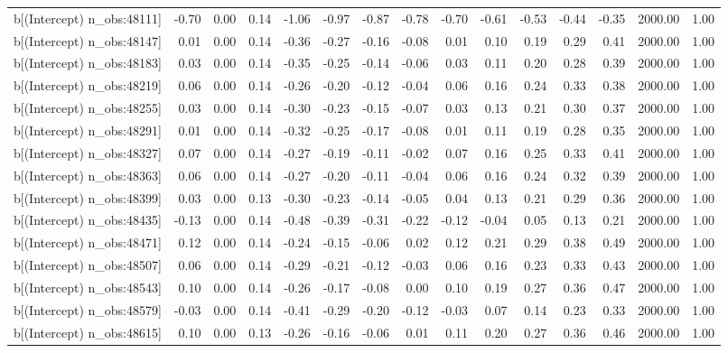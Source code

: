 \begin{table}[ht]
\begin{tabular}{rrrrrrrrrrrrrrr}
  b[(Intercept) n\_obs:48111] & -0.70 & 0.00 & 0.14 & -1.06 & -0.97 & -0.87 & -0.78 & -0.70 & -0.61 & -0.53 & -0.44 & -0.35 & 2000.00 & 1.00 \\ 
  b[(Intercept) n\_obs:48147] & 0.01 & 0.00 & 0.14 & -0.36 & -0.27 & -0.16 & -0.08 & 0.01 & 0.10 & 0.19 & 0.29 & 0.41 & 2000.00 & 1.00 \\ 
  b[(Intercept) n\_obs:48183] & 0.03 & 0.00 & 0.14 & -0.35 & -0.25 & -0.14 & -0.06 & 0.03 & 0.11 & 0.20 & 0.28 & 0.39 & 2000.00 & 1.00 \\ 
  b[(Intercept) n\_obs:48219] & 0.06 & 0.00 & 0.14 & -0.26 & -0.20 & -0.12 & -0.04 & 0.06 & 0.16 & 0.24 & 0.33 & 0.38 & 2000.00 & 1.00 \\ 
  b[(Intercept) n\_obs:48255] & 0.03 & 0.00 & 0.14 & -0.30 & -0.23 & -0.15 & -0.07 & 0.03 & 0.13 & 0.21 & 0.30 & 0.37 & 2000.00 & 1.00 \\ 
  b[(Intercept) n\_obs:48291] & 0.01 & 0.00 & 0.14 & -0.32 & -0.25 & -0.17 & -0.08 & 0.01 & 0.11 & 0.19 & 0.28 & 0.35 & 2000.00 & 1.00 \\ 
  b[(Intercept) n\_obs:48327] & 0.07 & 0.00 & 0.14 & -0.27 & -0.19 & -0.11 & -0.02 & 0.07 & 0.16 & 0.25 & 0.33 & 0.41 & 2000.00 & 1.00 \\ 
  b[(Intercept) n\_obs:48363] & 0.06 & 0.00 & 0.14 & -0.27 & -0.20 & -0.11 & -0.04 & 0.06 & 0.16 & 0.24 & 0.32 & 0.39 & 2000.00 & 1.00 \\ 
  b[(Intercept) n\_obs:48399] & 0.03 & 0.00 & 0.13 & -0.30 & -0.23 & -0.14 & -0.05 & 0.04 & 0.13 & 0.21 & 0.29 & 0.36 & 2000.00 & 1.00 \\ 
  b[(Intercept) n\_obs:48435] & -0.13 & 0.00 & 0.14 & -0.48 & -0.39 & -0.31 & -0.22 & -0.12 & -0.04 & 0.05 & 0.13 & 0.21 & 2000.00 & 1.00 \\ 
  b[(Intercept) n\_obs:48471] & 0.12 & 0.00 & 0.14 & -0.24 & -0.15 & -0.06 & 0.02 & 0.12 & 0.21 & 0.29 & 0.38 & 0.49 & 2000.00 & 1.00 \\ 
  b[(Intercept) n\_obs:48507] & 0.06 & 0.00 & 0.14 & -0.29 & -0.21 & -0.12 & -0.03 & 0.06 & 0.16 & 0.23 & 0.33 & 0.43 & 2000.00 & 1.00 \\ 
  b[(Intercept) n\_obs:48543] & 0.10 & 0.00 & 0.14 & -0.26 & -0.17 & -0.08 & 0.00 & 0.10 & 0.19 & 0.27 & 0.36 & 0.47 & 2000.00 & 1.00 \\ 
  b[(Intercept) n\_obs:48579] & -0.03 & 0.00 & 0.14 & -0.41 & -0.29 & -0.20 & -0.12 & -0.03 & 0.07 & 0.14 & 0.23 & 0.33 & 2000.00 & 1.00 \\ 
  b[(Intercept) n\_obs:48615] & 0.10 & 0.00 & 0.13 & -0.26 & -0.16 & -0.06 & 0.01 & 0.11 & 0.20 & 0.27 & 0.36 & 0.46 & 2000.00 & 1.00 \\ 

\end{tabular}
\end{table}
